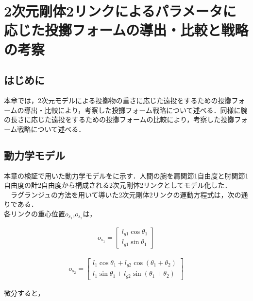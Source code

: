 \chapter[2次元剛体2リンクによるパラメータに応じた投擲フォームの導出・比較と戦略の考察]{2次元剛体2リンクによるパラメータに応じた投擲フォームの導出・比較と戦略の考察}

\section{はじめに}
本章では，2次元モデルによる投擲物の重さに応じた遠投をするための投擲フォームの導出・比較により，考察した投擲フォーム戦略について述べる．同様に腕の長さに応じた遠投をするための投擲フォームの比較により，考察した投擲フォーム戦略について述べる．
\section{動力学モデル}
本章の検証で用いた動力学モデルをに示す．人間の腕を肩関節1自由度と肘関節1自由度の計2自由度から構成される2次元剛体2リンクとしてモデル化した．\\
　ラグランジュの方法を用いて導いた2次元剛体2リンクの運動方程式は，次の通りである．\\
各リンクの重心位置$o_{s_{1}}$,$o_{s_{2}}$は，


\begin{eqnarray}
  o_{s_{1}} = 
              \begin{bmatrix}
              l_{g1}\cos\theta_{1}\\
              l_{g1}\sin\theta_{1}
              \end{bmatrix}
\end{eqnarray}

\begin{eqnarray}
  o_{s_{2}} = 
              \begin{bmatrix}
              l_{1}\cos\theta_{1} + l_{g2}\cos(\theta_{1} + \theta_{2})\\
              l_{1}\sin\theta_{1} + l_{g2}\sin(\theta_{1} + \theta_{2})
              \end{bmatrix}
\end{eqnarray}

微分すると，

